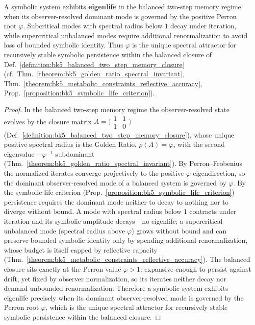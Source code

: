 \begin{corollary}
\label{corollary:bk5_symbolic_eigenlife}
A symbolic system exhibits \textbf{eigenlife} in the balanced two-step memory
regime when its observer-resolved dominant mode is governed by the positive
Perron root $\varphi$.  Subcritical modes with spectral radius below $1$ decay
under iteration, while supercritical unbalanced modes require additional
renormalization to avoid loss of bounded symbolic identity.  Thus $\varphi$ is
the unique spectral attractor for recursively stable symbolic persistence within
the balanced closure of
Def.~\ref{definition:bk5_balanced_two_step_memory_closure}
(cf.~Thm.~\ref{theorem:bk5_golden_ratio_spectral_invariant},
Thm.~\ref{theorem:bk5_metabolic_constraints_reflective_accuracy},
Prop.~\ref{proposition:bk5_symbolic_life_criterion}).
\end{corollary}
\begin{proof}
\label{proof:bk5_symbolic_eigenlife}
\leavevmode
In the balanced two-step memory regime the observer-resolved state evolves by the closure matrix $A=\big(\begin{smallmatrix}1&1\\1&0\end{smallmatrix}\big)$ (Def.~\ref{definition:bk5_balanced_two_step_memory_closure}), whose unique positive spectral radius is the Golden Ratio, $\rho(A)=\varphi$, with the second eigenvalue $-\varphi^{-1}$ subdominant (Thm.~\ref{theorem:bk5_golden_ratio_spectral_invariant}). By Perron--Frobenius the normalized iterates converge projectively to the positive $\varphi$-eigendirection, so the dominant observer-resolved mode of a balanced system is governed by $\varphi$. By the symbolic life criterion (Prop.~\ref{proposition:bk5_symbolic_life_criterion}) persistence requires the dominant mode neither to decay to nothing nor to diverge without bound. A mode with spectral radius below $1$ contracts under iteration and its symbolic amplitude decays---no eigenlife; a supercritical unbalanced mode (spectral radius above $\varphi$) grows without bound and can preserve bounded symbolic identity only by spending additional renormalization, whose budget is itself capped by reflective capacity (Thm.~\ref{theorem:bk5_metabolic_constraints_reflective_accuracy}). The balanced closure sits exactly at the Perron value $\varphi>1$: expansive enough to persist against drift, yet fixed by observer normalization, so its iterates neither decay nor demand unbounded renormalization. Therefore a symbolic system exhibits eigenlife precisely when its dominant observer-resolved mode is governed by the Perron root $\varphi$, which is the unique spectral attractor for recursively stable symbolic persistence within the balanced closure.
\end{proof}

